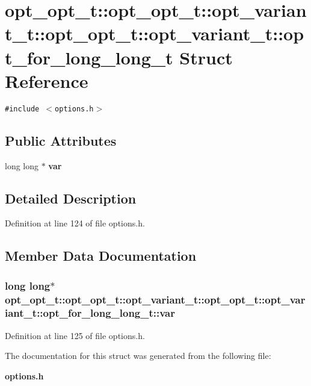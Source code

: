 \section{opt\_\-opt\_\-t::opt\_\-opt\_\-t::opt\_\-variant\_\-t::opt\_\-opt\_\-t::opt\_\-variant\_\-t::opt\_\-for\_\-long\_\-long\_\-t Struct Reference}
\label{structopt__opt__t_1_1opt__variant__t_1_1opt__for__long__long__t}
{\tt \#include $<$options.h$>$}

\subsection*{Public Attributes}
\begin{CompactItemize}
\item 
long long $\ast$ {\bf var}
\end{CompactItemize}


\subsection{Detailed Description}


Definition at line 124 of file options.h.

\subsection{Member Data Documentation}
\subsubsection[{var}]{\setlength{\rightskip}{0pt plus 5cm}long long$\ast$ opt\_\-opt\_\-t::opt\_\-opt\_\-t::opt\_\-variant\_\-t::opt\_\-opt\_\-t::opt\_\-variant\_\-t::opt\_\-for\_\-long\_\-long\_\-t::var}\label{structopt__opt__t_1_1opt__variant__t_1_1opt__for__long__long__t_fbab13a5b592d311c7ddde815bd130dd}




Definition at line 125 of file options.h.

The documentation for this struct was generated from the following file:\begin{CompactItemize}
\item 
{\bf options.h}\end{CompactItemize}
